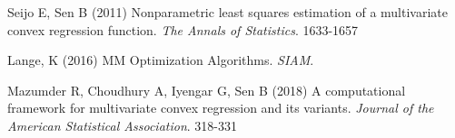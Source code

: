\documentclass{article}
\begin{document}
\begin{thebibliography}{99}
    Seijo E, Sen B (2011) {Nonparametric least squares estimation of a multivariate convex regression function}. {\it The Annals of Statistics}. 1633-1657
    
    Lange, K (2016) {MM Optimization Algorithms}. {\it SIAM}.

    Mazumder R, Choudhury A, Iyengar G, Sen B (2018) {A computational framework for multivariate convex regression and its variants}. {\it Journal of the American Statistical Association}. 318-331
\end{thebibliography}
\end{document}
